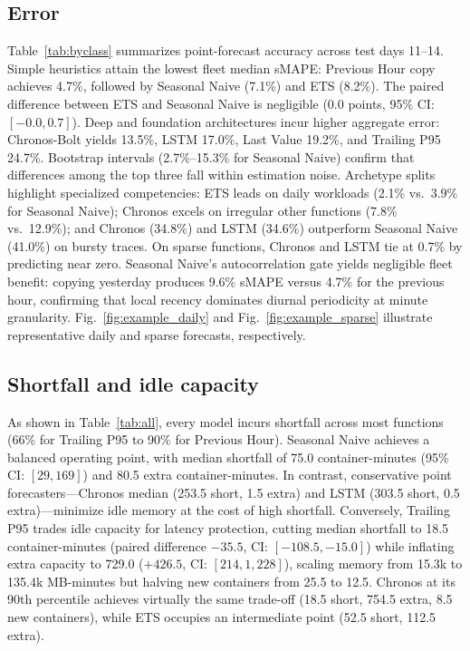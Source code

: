 \documentclass[conference,a4paper]{IEEEtran}
\begin{document}
\subsection{Error}
Table~\ref{tab:byclass} summarizes point-forecast accuracy across test days 11--14. Simple heuristics attain the lowest fleet median sMAPE: Previous Hour copy achieves 4.7\%, followed by Seasonal Naive (7.1\%) and ETS (8.2\%). The paired difference between ETS and Seasonal Naive is negligible (0.0 points, 95\% CI: $[-0.0, 0.7]$). Deep and foundation architectures incur higher aggregate error: Chronos-Bolt yields 13.5\%, LSTM 17.0\%, Last Value 19.2\%, and Trailing P95 24.7\%. Bootstrap intervals (2.7\%--15.3\% for Seasonal Naive) confirm that differences among the top three fall within estimation noise. Archetype splits highlight specialized competencies: ETS leads on daily workloads (2.1\% vs.\ 3.9\% for Seasonal Naive); Chronos excels on irregular other functions (7.8\% vs.\ 12.9\%); and Chronos (34.8\%) and LSTM (34.6\%) outperform Seasonal Naive (41.0\%) on bursty traces. On sparse functions, Chronos and LSTM tie at 0.7\% by predicting near zero. Seasonal Naive's autocorrelation gate yields negligible fleet benefit: copying yesterday produces 9.6\% sMAPE versus 4.7\% for the previous hour, confirming that local recency dominates diurnal periodicity at minute granularity. Fig.~\ref{fig:example_daily} and Fig.~\ref{fig:example_sparse} illustrate representative daily and sparse forecasts, respectively.

\subsection{Shortfall and idle capacity}
As shown in Table~\ref{tab:all}, every model incurs shortfall across most functions (66\% for Trailing P95 to 90\% for Previous Hour). Seasonal Naive achieves a balanced operating point, with median shortfall of 75.0 container-minutes (95\% CI: $[29, 169]$) and 80.5 extra container-minutes. In contrast, conservative point forecasters---Chronos median (253.5 short, 1.5 extra) and LSTM (303.5 short, 0.5 extra)---minimize idle memory at the cost of high shortfall. Conversely, Trailing P95 trades idle capacity for latency protection, cutting median shortfall to 18.5 container-minutes (paired difference $-35.5$, CI: $[-108.5, -15.0]$) while inflating extra capacity to 729.0 ($+426.5$, CI: $[214, 1{,}228]$), scaling memory from 15.3k to 135.4k MB-minutes but halving new containers from 25.5 to 12.5. Chronos at its 90th percentile achieves virtually the same trade-off (18.5 short, 754.5 extra, 8.5 new containers), while ETS occupies an intermediate point (52.5 short, 112.5 extra).
\end{document}
